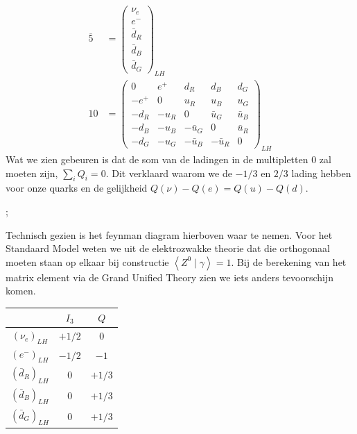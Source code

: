 \documentclass[../main.tex]{subfiles}
\begin{document}
\begin{equation}
    \begin{aligned}
        \label{eq:qut_multipletten}
        \overline{5}&=\left(\begin{array}{c}
                \nu_{e} \\
                e^{-} \\
                \bar{d}_{R} \\
                \bar{d}_{B} \\
                \bar{d}_{G}
        \end{array}\right)_{L H}\\
        10&=\left(\begin{array}{ccccc}
                0 & e^{+} & d_{R} & d_{B} & d_{G} \\
                -e^{+} & 0 & u_{R} & u_{B} & u_{G} \\
                -d_{R} & -u_{R} & 0 & \bar{u}_{G} & \bar{u}_{B} \\
                -d_{B} & -u_{B} & -\bar{u}_{G} & 0 & \bar{u}_{R} \\
                -d_{G} & -u_{G} & -\bar{u}_{B} & -\bar{u}_{R} & 0
        \end{array}\right)_{L H}
    \end{aligned}
\end{equation}
Wat we zien gebeuren is dat de som van de ladingen in de multipletten 0 zal moeten zijn, $\sum_{i} Q_{i}=0$. Dit verklaard waarom we de $-1/3$ en $2/3$ lading hebben voor onze quarks en de gelijkheid $Q(\nu)-Q(e)=Q(u)-Q(d)$.\\
\begin{center}
    ;
\end{center}
Technisch gezien is het feynman diagram hierboven waar te nemen. Voor het Standaard Model weten we uit de elektrozwakke theorie dat die orthogonaal moeten staan op elkaar bij constructie $\left< Z^0\mid \gamma\right> = 1$. Bij de berekening van het matrix element via de Grand Unified Theory zien we iets anders tevoorschijn komen.
\begin{table}[h]
    \centering
    \begin{tabular}{c|cc}
        & $I_{3}$ & $Q$ \\
        \hline
        $\left(\nu_{e}\right)_{L H}$ & $+1 / 2$ & $0$ \\
        $\left(e^{-}\right)_{L H}$ & $-1 / 2$ & $-1$ \\
        $\left(\bar{d}_{R}\right)_{L H}$ & $0$ & $+1 / 3$ \\
        $\left(\bar{d}_{B}\right)_{L H}$ & $0$ & $+1 / 3$ \\
        $\left(\bar{d}_{G}\right)_{L H}$ & $0$ & $+1 / 3$
    \end{tabular}
\end{table}
\end{document}
